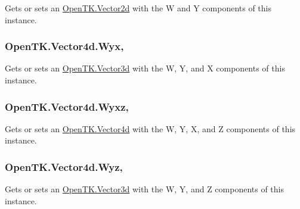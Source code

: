 Gets or sets an \hyperlink{struct_open_t_k_1_1_vector2d}{Open\-T\-K.\-Vector2d} with the W and Y components of this instance. 

\hypertarget{struct_open_t_k_1_1_vector4d_a54fa95a36d8f0f19fb27fd8ccea96e56}{
\subsubsection[{Wyx}]{ Open\-T\-K.\-Vector4d.\-Wyx\hspace{0.3cm}{\ttfamily [get]}, {\ttfamily [set]}}}\label{struct_open_t_k_1_1_vector4d_a54fa95a36d8f0f19fb27fd8ccea96e56}


Gets or sets an \hyperlink{struct_open_t_k_1_1_vector3d}{Open\-T\-K.\-Vector3d} with the W, Y, and X components of this instance. 

\hypertarget{struct_open_t_k_1_1_vector4d_a765866b8f9b1ee679a967fc23f16e2ef}{
\subsubsection[{Wyxz}]{ Open\-T\-K.\-Vector4d.\-Wyxz\hspace{0.3cm}{\ttfamily [get]}, {\ttfamily [set]}}}\label{struct_open_t_k_1_1_vector4d_a765866b8f9b1ee679a967fc23f16e2ef}


Gets or sets an \hyperlink{struct_open_t_k_1_1_vector4d}{Open\-T\-K.\-Vector4d} with the W, Y, X, and Z components of this instance. 

\hypertarget{struct_open_t_k_1_1_vector4d_acb47d15e462f5992e0f3980aa3217f41}{
\subsubsection[{Wyz}]{ Open\-T\-K.\-Vector4d.\-Wyz\hspace{0.3cm}{\ttfamily [get]}, {\ttfamily [set]}}}\label{struct_open_t_k_1_1_vector4d_acb47d15e462f5992e0f3980aa3217f41}


Gets or sets an \hyperlink{struct_open_t_k_1_1_vector3d}{Open\-T\-K.\-Vector3d} with the W, Y, and Z components of this instance. 

